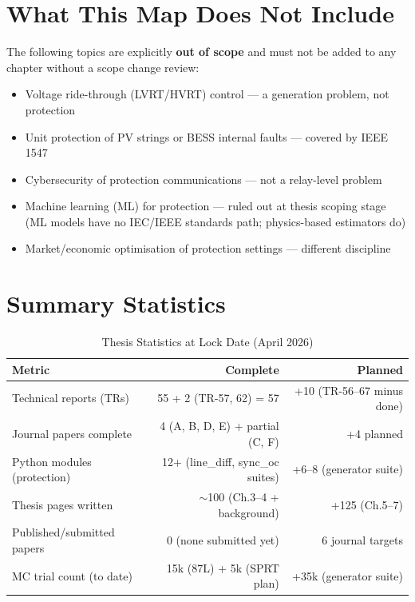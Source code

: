 \documentclass[11pt, a4paper]{article}
\begin{document}
\section{What This Map Does Not Include}
\label{sec:exclusions}

The following topics are explicitly \textbf{out of scope} and must not be added
to any chapter without a scope change review:

\begin{itemize}[nosep]
  \item Voltage ride-through (LVRT/HVRT) control — a generation problem, not protection
  \item Unit protection of PV strings or BESS internal faults — covered by IEEE 1547
  \item Cybersecurity of protection communications — not a relay-level problem
  \item Machine learning (ML) for protection — ruled out at thesis scoping stage
    (ML models have no IEC/IEEE standards path; physics-based estimators do)
  \item Market/economic optimisation of protection settings — different discipline
\end{itemize}

\section{Summary Statistics}
\label{sec:stats}

\begin{table}[!h]
\centering
\caption{Thesis Statistics at Lock Date (April 2026)}
\label{tab:stats}
\begin{tabular}{lrr}
\toprule
Metric & Complete & Planned \\
\midrule
Technical reports (TRs) & 55 + 2 (TR-57, 62) = 57 & +10 (TR-56--67 minus done) \\
Journal papers complete & 4 (A, B, D, E) + partial (C, F) & +4 planned \\
Python modules (protection) & 12+ (line\_diff, sync\_oc suites) & +6--8 (generator suite) \\
Thesis pages written & $\sim$100 (Ch.3--4 + background) & +125 (Ch.5--7) \\
Published/submitted papers & 0 (none submitted yet) & 6 journal targets \\
MC trial count (to date) & 15k (87L) + 5k (SPRT plan) & +35k (generator suite) \\
\bottomrule
\end{tabular}
\end{table}
\end{document}
